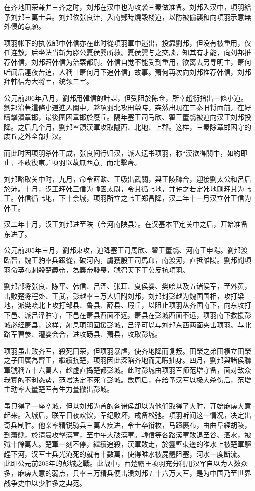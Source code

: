 在齐地田荣兼并三齐之时，刘邦在汉中也为攻袭三秦做准备。刘邦入汉中，項羽給予刘邦三萬士兵。刘邦依张良计，入南鄭時燒毀棧道，以防被偷襲和向項羽示意無外侵的意願。

项羽帐下的执戟郎中韩信亦在此时從項羽軍中逃出，投靠劉邦，但没有被重用，仅任连敖，后坐法当斩为滕公夏侯婴所救。夏侯婴与之交談，知其有才能，向刘邦推荐韩信，刘邦拜韩信为治粟都尉。韩信自觉不能受到重用，欲离去另寻明主，萧何听闻后連夜苦追，人稱「萧何月下追韩信」故事。萧何再次向刘邦推荐韩信，刘邦拜韩信为大将军，统领三军。

公元前206年八月，劉邦用韓信的計謀，但受阻於陈仓，所幸趙衍指出一條小道。劉邦沿著這條小道進入關中，趁項羽北攻田榮時，突然出现在三秦旧将面前，在好疇擊潰章邯，最後圍困章邯於廢丘。隔年塞王司马欣、翟王董翳被迫向汉王刘邦投降。之后几个月，劉邦率領漢軍攻取隴西、北地、上郡。这样，三秦除章邯困守的废丘之外全部归汉。

而此时因项羽杀韩王成，张良间行归汉，派人遗书项羽，称“漢欲得關中，如約即止，不敢復東。”项羽以故無西意，而北擊齊。

刘邦略取关中时，九月，命令薛歐、王吸出武關，與王陵聯合，迎接劉太公和呂后於沛。十月，汉王拜韩王信为韓國太尉，令其循韩地，并许之若定韩地则拜其为韩王。韩信循韩地，下十余城，项羽所立之韩王郑昌降，汉二年十一月汉立韩王信为韩王。

汉二年十月，汉王刘邦进至陕（今河南陕县）。在汉基本平定关中之后，开始准备东进了。

公元前205年三月，劉邦東攻，迫降塞王司馬欣、翟王董翳、河南王申陽。劉邦渡臨晉，魏王豹率兵跟從，破河內，虜獲殷王司馬卬，南渡河，直抵雒陽。劉邦聞項羽命英布刺殺楚義帝，為義帝發喪，號召天下王公反抗項羽。

劉邦部将张良、陈平、韩信、吕泽、张耳、夏侯婴、樊哙以及五诸侯军，至外黄，击败楚将程处、王武，彭越率三万人归附刘邦，刘邦封彭越为魏国国相，攻打梁地，派樊哙北上攻打邹县、鲁县、薛县、瑕丘，以阻止项羽从齐国南下，向东攻打下邑、派吕泽驻守，下邑在萧县西面不远，萧县在彭城西面不远，项羽南下救援彭城必经萧县，这样，如果项羽回援彭城，吕泽可以与刘邦东西两面夹击项羽。与北路军曹参、灌婴会合，进攻砀县、萧县，攻取彭城。

项羽虽击败齐军，殺死田荣，但项羽暴虐，使齐地降而复叛。田榮之弟田橫立田榮之子田廣為齊王，繼續抗楚，项羽因此深陷齐地而无暇抽身。四月，劉邦與諸侯聯軍號稱五十六萬人，趁虚直捣楚都彭城。此时彭城由项羽军师范增守备，面对敌众我寡的不利态势，范增决定不死守彭城。数周后，在给予汉军以极大杀伤后，范增主动率大量楚军有生力量撤出彭城。

虽只得了一座空城，但以刘邦为首的各诸侯却以为他们取得了大胜，开始麻痹大意起来。入城后，联军日夜欢饮，军纪败坏，戒备松弛。項羽听闻这一情况，决定出奇兵制胜。他亲率精锐骑兵三萬人疾进，令士卒衔枚，马蹄裹布，由曲阜經胡陵，到蕭縣，於清晨攻擊漢軍，至中午大破漢軍。韓信等各路漢軍敗退至谷、泗水，被殲十餘萬人。楚軍一刻不停，繼續追殺，漢軍敗走，於靈壁東邊的睢水上被楚軍驅趕下河，汉军士兵光淹死的就有十數萬，使得睢水被屍體阻塞，河水一度断流。 此即公元前205年的彭城之戰。此战中，西楚霸王项羽充分利用汉军自以为人数众多，麻痹大意的弱点，只率三万精兵便击溃刘邦五十六万大军，是为中国乃至世界战争史中以少胜多之典范。

